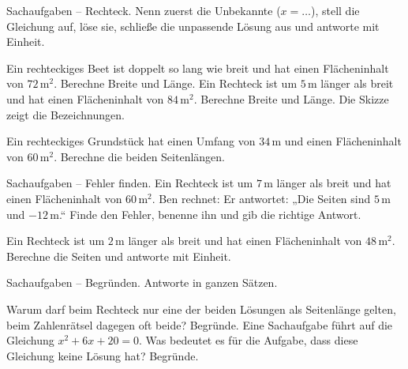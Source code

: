 \begin{aufgabe}{Sachaufgaben -- Rechteck. Nenn zuerst die Unbekannte ($x = \ldots$),
stell die Gleichung auf, löse sie, schließe die unpassende Lösung aus und antworte
mit Einheit.}
\begin{teile}
\teil Ein rechteckiges Beet ist doppelt so lang wie breit und hat einen
Flächeninhalt von $72\,\text{m}^2$. Berechne Breite und Länge.
\teil Ein Rechteck ist um $5\,$m länger als breit und hat einen Flächeninhalt von
$84\,\text{m}^2$. Berechne Breite und Länge. Die Skizze zeigt die Bezeichnungen.
\end{teile}


\begin{teile}
\setcounter{teil}{2}
\teil Ein rechteckiges Grundstück hat einen Umfang von $34\,$m und einen
Flächeninhalt von $60\,\text{m}^2$. Berechne die beiden Seitenlängen.
\end{teile}
\end{aufgabe}

\begin{aufgabe}{Sachaufgaben -- Fehler finden. Ein Rechteck ist um $7\,$m länger als
breit und hat einen Flächeninhalt von $60\,\text{m}^2$. Ben rechnet:}
Er antwortet: „Die Seiten sind $5\,$m und $-12\,$m.`` Finde den Fehler, benenne ihn
und gib die richtige Antwort.

\begin{teile}
\teil Ein Rechteck ist um $2\,$m länger als breit und hat einen Flächeninhalt von
$48\,\text{m}^2$. Berechne die Seiten und antworte mit Einheit.
\end{teile}
\end{aufgabe}

\begin{aufgabe}{Sachaufgaben -- Begründen. Antworte in ganzen Sätzen.}
\begin{teile}
\teil Warum darf beim Rechteck nur eine der beiden Lösungen als Seitenlänge gelten,
beim Zahlenrätsel dagegen oft beide? Begründe.
\teil Eine Sachaufgabe führt auf die Gleichung $x^2 + 6x + 20 = 0$. Was bedeutet es
für die Aufgabe, dass diese Gleichung keine Lösung hat? Begründe.
\end{teile}
\end{aufgabe}
